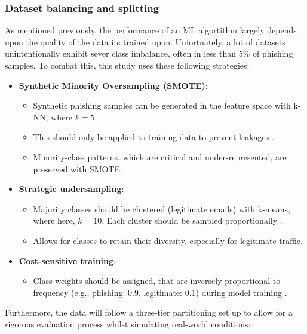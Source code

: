 
\subsubsection*{Dataset balancing and splitting}
As mentioned previously, the performance of an ML algortithm largely depends upon the quality of the data its trained upon. Unfortnately, a lot of datasets unintentionally exhibit sever class imbalance, often in less than 5\% of phishing samples. To combat this, this study uses these following strategies:

\begin{itemize}
  \item \textbf{Synthetic Minority Oversampling (SMOTE)}:
  \begin{itemize}
    \item Synthetic phishing samples can be generated in the feature space with k-NN, where $k = 5$. 
    \item This should only be applied to training data to prevent leakages \citep{ahmad2024across}.
    \item Minority-class patterns, which are critical and under-represented, are preserved with SMOTE.
  \end{itemize}
  \item \textbf{Strategic undersampling}:
  \begin{itemize}
    \item Majority classes should be clustered (legitimate emails) with k-means, where here, $k = 10$. Each cluster should be sampled proportionally \citep{zamir2020phishing}.
    \item Allows for classes to retain their diversity, especially for legitimate traffic.
  \end{itemize}
  \item \textbf{Cost-sensitive training}:
  \begin{itemize}
    \item Class weights should be assigned, that are inversely proportional to frequency (e.g., phishing: 0.9, legitimate: 0.1) during model training \citep{gupta2021novel}.
  \end{itemize}
\end{itemize}

\noindent Furthermore, the data will follow a three-tier partitioning set up to allow for a rigorous evaluation process whilst simulating real-world conditions:

